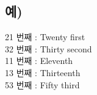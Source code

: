 \documentclass[a4paper, 12pt, twocolumn]{oblivoir}
\begin{document}
    \subsection*{\large 예)}
    21 번째 : \small Twenty first\\
    32 번째 : \small Thirty second\\
    11 번째 : \small Eleventh\\
    13 번째 : \small Thirteenth\\
    53 번째 : \small Fifty third\\

\thispagestyle{empty}
    


        
        

    
\end{document}
